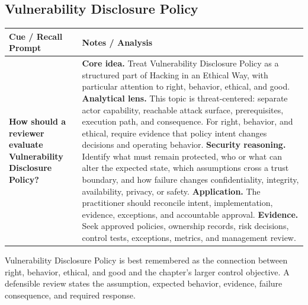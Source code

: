 \documentclass[11pt]{article}
\newcommand{\CornellHeader}{%
\rowcolor{Navy}\color{white}\bfseries Cue / Recall Prompt & \color{white}\bfseries Notes / Analysis\\\hline}
\newcommand{\CornellRow}[2]{%
\cellcolor{CueGray}\RaggedRight\textbf{#1} & \RaggedRight #2\\\hline}
\begin{document}
\subsection*{Vulnerability Disclosure Policy}
\begin{longtable}{>{\RaggedRight\arraybackslash}p{}|>{\RaggedRight\arraybackslash}p{}}
\CornellHeader
\CornellRow{How should a reviewer evaluate Vulnerability Disclosure Policy?}{\textbf{Core idea.} Treat Vulnerability Disclosure Policy as a structured part of Hacking in an Ethical Way, with particular attention to right, behavior, ethical, and good. \textbf{Analytical lens.} This topic is threat-centered: separate actor capability, reachable attack surface, prerequisites, execution path, and consequence. For right, behavior, and ethical, require evidence that policy intent changes decisions and operating behavior. \textbf{Security reasoning.} Identify what must remain protected, who or what can alter the expected state, which assumptions cross a trust boundary, and how failure changes confidentiality, integrity, availability, privacy, or safety. \textbf{Application.} The practitioner should reconcile intent, implementation, evidence, exceptions, and accountable approval. \textbf{Evidence.} Seek approved policies, ownership records, risk decisions, control tests, exceptions, metrics, and management review.}
\end{longtable}
\begin{topicsummary}
Vulnerability Disclosure Policy is best remembered as the connection between right, behavior, ethical, and good and the chapter's larger control objective. A defensible review states the assumption, expected behavior, evidence, failure consequence, and required response.
\end{topicsummary}
\end{document}
